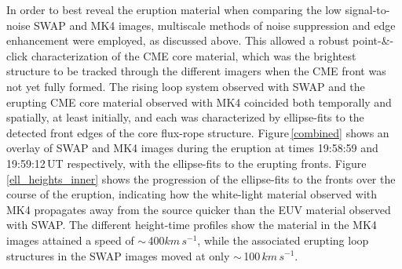 \documentclass[namedreferences]{solarphysics}
\begin{document}
\begin{article}
In order to best reveal the eruption material when comparing the low signal-to-noise SWAP and MK4 images, multiscale methods of noise suppression and edge enhancement were employed, as discussed above. This allowed a robust point-\&-click characterization of the CME core material, which was the brightest structure to be tracked through the different imagers when the CME front was not yet fully formed. The rising loop system observed with SWAP and the erupting CME core material observed with MK4 coincided both temporally and spatially, at least initially, and each was characterized by ellipse-fits to the detected front edges of the core flux-rope structure. Figure\,\ref{combined} shows an overlay of SWAP and MK4 images during the eruption at times 19:58:59 and 19:59:12\,UT respectively, with the ellipse-fits to the erupting fronts. Figure\,\ref{ell_heights_inner} shows the progression of the ellipse-fits to the fronts over the course of the eruption, indicating how the white-light material observed with MK4 propagates away from the source quicker than the EUV material observed with SWAP. The different height-time profiles show the material in the MK4 images attained a speed of $\sim$\,400$km\,s^{-1}$, while the associated erupting loop structures in the SWAP images moved at only $\sim$\,100$\,km\,s^{-1}$. %



\end{article}
\end{document}
